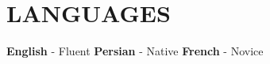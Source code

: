 \section{LANGUAGES}
\textbf{English} - Fluent \enspace \enspace \textbf{Persian} - Native \enspace \enspace \textbf{French} - Novice
